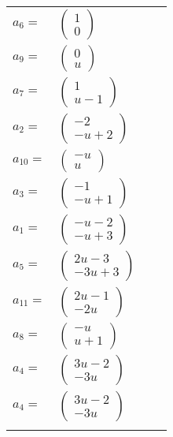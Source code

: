 \documentclass[1p]{elsarticle_modified}
\theoremstyle{definition}
\begin{document}
\begin{tabular}{m{7pt} m{180pt} m{7pt} m{180pt} }
\flushright $a_{6}=$&$\begin{pmatrix}1\\0\end{pmatrix}$ \\
\flushright $a_{9}=$&$\begin{pmatrix}0\\u\end{pmatrix}$ \\
\flushright $a_{7}=$&$\begin{pmatrix}1\\u-1\end{pmatrix}$ \\
\flushright $a_{2}=$&$\begin{pmatrix}-2\\- u+2\end{pmatrix}$ \\
\flushright $a_{10}=$&$\begin{pmatrix}- u\\u\end{pmatrix}$ \\
\flushright $a_{3}=$&$\begin{pmatrix}-1\\- u+1\end{pmatrix}$ \\
\flushright $a_{1}=$&$\begin{pmatrix}- u-2\\- u+3\end{pmatrix}$ \\
\flushright $a_{5}=$&$\begin{pmatrix}2 u-3\\-3 u+3\end{pmatrix}$ \\
\flushright $a_{11}=$&$\begin{pmatrix}2 u-1\\-2 u\end{pmatrix}$ \\
\flushright $a_{8}=$&$\begin{pmatrix}- u\\u+1\end{pmatrix}$ \\
\flushright $a_{4}=$&$\begin{pmatrix}3 u-2\\-3 u\end{pmatrix}$\\ \flushright $a_{4}=$&$\begin{pmatrix}3 u-2\\-3 u\end{pmatrix}$\\&\end{tabular}
\end{document}
